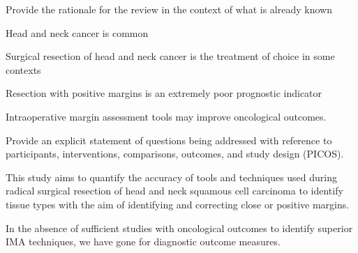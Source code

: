 
Provide the rationale for the review in the context of what is already known

Head and neck cancer is common

Surgical resection of head and neck cancer is the treatment of choice in some contexts

Resection with positive margins is an extremely poor prognostic indicator

Intraoperative margin assessment tools may improve oncological outcomes.



Provide an explicit statement of questions being addressed with reference to participants, interventions, comparisons, outcomes, and study design (PICOS). 

This study aims to quantify the accuracy of tools and techniques used during radical surgical resection of head and neck squamous cell carcinoma to identify tissue types with the aim of identifying and correcting close or positive margins.


In the absence of sufficient studies with oncological outcomes to identify superior IMA techniques, we have gone for diagnostic outcome measures.
